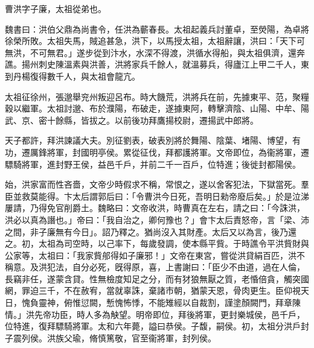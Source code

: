 
\begin{pinyinscope}
曹洪字子廉，太祖從弟也。

魏書曰：洪伯父鼎為尚書令，任洪為蘄春長。太祖起義兵討董卓，至熒陽，為卓將徐榮所敗。太祖失馬，賊追甚急，洪下，以馬授太祖，太祖辭讓，洪曰：「天下可無洪，不可無君。」遂步從到汴水，水深不得渡，洪循水得船，與太祖俱濟，還奔譙。揚州刺史陳溫素與洪善，洪將家兵千餘人，就溫募兵，得廬江上甲二千人，東到丹楊復得數千人，與太祖會龍亢。

太祖征徐州，張邈舉兖州叛迎呂布。時大饑荒，洪將兵在前，先據東平、范，聚糧穀以繼軍。太祖討邈、布於濮陽，布破走，遂據東阿，轉擊濟陰、山陽、中牟、陽武、京、密十餘縣，皆拔之。以前後功拜鷹揚校尉，遷揚武中郎將。

天子都許，拜洪諫議大夫。別征劉表，破表別將於舞陽、陰葉、堵陽、博望，有功，遷厲鋒將軍，封國明亭侯。累從征伐，拜都護將軍。文帝即位，為衞將軍，遷驃騎將軍，進封野王侯，益邑千戶，并前二千一百戶，位特進；後徙封都陽侯。

始，洪家富而性吝嗇，文帝少時假求不稱，常恨之，遂以舍客犯法，下獄當死。羣臣並救莫能得。卞太后謂郭后曰：「令曹洪今日死，吾明日勑帝廢后矣。」於是泣涕屢請，乃得免官削爵土。魏略曰：文帝收洪，時曹真在左右，請之曰：「今誅洪，洪必以真為譖也。」帝曰：「我自治之，卿何豫也？」會卞太后責怒帝，言「梁、沛之間，非子廉無有今日」。詔乃釋之。猶尚沒入其財產。太后又以為言，後乃還之。初，太祖為司空時，以己率下，每歲發調，使本縣平貲。于時譙令平洪貲財與公家等，太祖曰：「我家貲郍得如子廉邪！」文帝在東宮，嘗從洪貸絹百匹，洪不稱意。及洪犯法，自分必死，旣得原，喜，上書謝曰：「臣少不由道，過在人倫，長竊非任，遂蒙含貸。性無檢度知足之分，而有犲狼無厭之質，老惛倍貪，觸突國網，罪迫三千，不在赦宥，當就辜誅，棄諸市朝，猶蒙天恩，骨肉更生。臣仰視天日，愧負靈神，俯惟愆闕，慙愧怖悸，不能雉經以自裁割，謹塗顏闕門，拜章陳情。」洪先帝功臣，時人多為觖望。明帝即位，拜後將軍，更封樂城侯，邑千戶，位特進，復拜驃騎將軍。太和六年薨，謚曰恭侯。子馥，嗣侯。初，太祖分洪戶封子震列侯。洪族父瑜，脩慎篤敬，官至衞將軍，封列侯。


\end{pinyinscope}